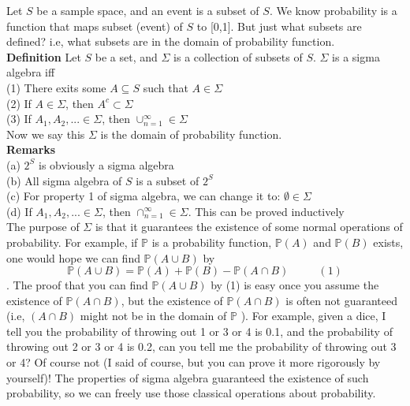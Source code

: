 \documentclass[a4paper,12pt]{article}
\begin{document}
Let $S$ be a sample space, and an event is a subset of $S$. We know probability is a function that maps subset (event) of $S$ to [0,1]. But just what subsets are defined? i.e, what subsets are in the domain of probability function.\\

\textbf{Definition} Let $S$ be a set, and $\Sigma$ is a collection of subsets of $S$.  $\Sigma$ is a sigma algebra  iff\\
(1) There exits some $A \subseteq S$ such that $A\in\Sigma$\\
(2) If $A \in \Sigma$, then $A^c \subset \Sigma$\\
(3) If $A_1, A_2, ... \in \Sigma$, then $\cup_{n=1}^\infty \in \Sigma$\\

Now we say this $\Sigma$ is the domain of probability function.\\

\textbf{Remarks}\\
(a) $2^S$ is obviously a sigma algebra\\
(b) All sigma algebra of $S$ is a subset of $2^S$\\
(c) For property 1 of sigma algebra, we can change it to: $\emptyset \in \Sigma$\\
(d) If $A_1, A_2, ... \in \Sigma$, then $\cap_{n=1}^\infty \in \Sigma$. This can be proved inductively\\

The purpose of $\Sigma$ is that it guarantees the existence of some normal operations of probability. For example, if $\mathbb{P}$ is a probability function, $\mathbb{P}(A)$ and $\mathbb{P}(B)$ exists, one would hope we can find $\mathbb{P}(A \cup B)$ by 
$$\mathbb{P}(A \cup B) = \mathbb{P}(A) +  \mathbb{P}(B) - \mathbb{P}(A \cap B) \ \ \ \ \ \ \ \ \ \ \ \ (1)$$
. The proof that you can find $\mathbb{P}(A \cup B)$ by (1) is easy once you assume the existence of $\mathbb{P}(A \cap B)$, but the existence of $\mathbb{P}(A \cap B)$ is often not guaranteed (i.e, $(A \cap B)$ might not be in the domain of $\mathbb{P}$ ). For example, given a dice, I tell you the probability of throwing out 1 or 3 or 4 is 0.1, and  the probability of throwing out 2 or 3 or 4 is 0.2, can you tell me the probability of throwing out 3 or 4? Of course not (I said of course, but you can prove it more rigorously by yourself)! The properties of sigma algebra guaranteed the existence of such probability, so we can freely use those classical operations about probability.
\end{document}
